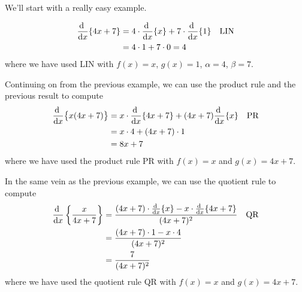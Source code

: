 We'll start with a really easy example.

\begin{eg}\label{eg:DIFFsimpleToolsAA}
  \begin{align*}
  \diff{}{x} \{ 4x + 7 \}
  &= 4 \cdot \diff{}{x} \{ x \}  + 7 \cdot \diff{}{x} \{ 1 \} & \text{LIN}\\
  &= 4 \cdot 1 + 7 \cdot 0 = 4
\end{align*}
where we have used LIN with $f(x)=x$, $g(x)=1$, $\alpha=4$, $\beta=7$.
\end{eg}

\begin{eg}\label{eg:DIFFsimpleToolsAB}
Continuing on from the previous example, we can use the product rule
and the previous result to compute
  \begin{align*}
  \diff{}{x} \big\{ x ( 4x + 7) \big\}
  &= x \cdot \diff{}{x} \{ 4x + 7 \} + (4x+7) \diff{}{x} \{ x \} &
\text{PR} \\
  &= x \cdot 4 + (4x+7) \cdot 1 \\
  &= 8x+7
\end{align*}
where we have used the product rule PR with $f(x) =x$ and $g(x)=4x+7$.
\end{eg}
\begin{eg}\label{eg:DIFFsimpleToolsAB2}
In the same vein as the previous example, we can use the quotient rule to compute
  \begin{align*}
  \diff{}{x} \left\{ \frac{x}{4x + 7} \right \}
  &= \frac{ (4x+7) \cdot \diff{}{x} \{x\}  - x \cdot \diff{}{x} \{ 4x + 7 \} }{(4x+7)^2}
& \text{QR}  \\
  &= \frac{ (4x+7) \cdot 1  - x \cdot 4 }{(4x+7)^2}  \\
&= \frac{7}{(4x+7)^2}
\end{align*}
where we have used the quotient rule QR with $f(x) =x$ and $g(x)=4x+7$.
\end{eg}


